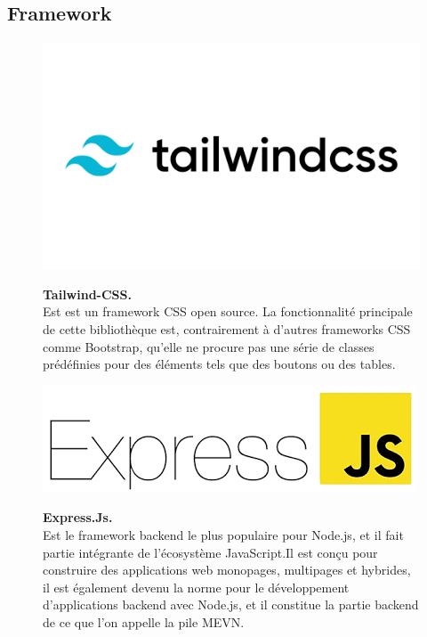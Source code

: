 \subsection{Framework}
\begin{figure}[H]
    \centering
    \begin{minipage}[c]{0.3\textwidth}
        \includegraphics[width=\linewidth]{projet/images/diagramme de sequance/images/Tailwind-CSS.png}
    \end{minipage}
    \hspace{1cm}
    \begin{minipage}[c]{0.6\textwidth}
        \textbf{Tailwind-CSS.}\\[0.5em]
        Est est un framework CSS open source. La fonctionnalité principale de cette bibliothèque est, contrairement à d'autres frameworks CSS comme Bootstrap, qu'elle ne procure pas une série de classes prédéfinies pour des éléments tels que des boutons ou des tables.\cite{ref13}
    \end{minipage}
\end{figure}
\vspace{0.5cm}

\begin{figure}[H]
    \centering
    \begin{minipage}[c]{0.3\textwidth}
        \includegraphics[width=\linewidth]{projet/images/diagramme de sequance/images/express.png}
    \end{minipage}
    \hspace{1cm}
    \begin{minipage}[c]{0.6\textwidth}
        \textbf{Express.Js.}\\[0.5em]
     Est le framework backend le plus populaire pour Node.js, et il fait partie intégrante de l’écosystème JavaScript.Il est conçu pour construire des applications web monopages, multipages et hybrides, il est également devenu la norme pour le développement d’applications backend avec Node.js, et il constitue la partie backend de ce que l’on appelle la pile MEVN. \cite{ref14}
    \end{minipage}
\end{figure}
